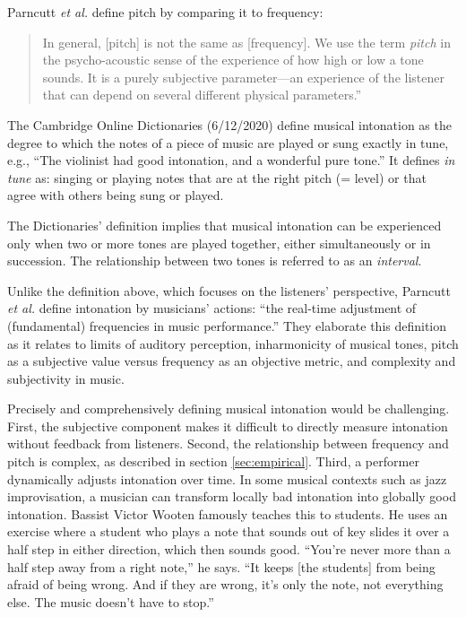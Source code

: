 Parncutt \textit{et al.} define pitch by comparing it to frequency: 
\begin{quotation}In general, [pitch] is not the same as [frequency]. We use the term \textit{pitch} in the psycho-acoustic sense of the experience of how high or low a tone sounds. It is a purely subjective parameter---an experience of the listener that can depend on several different physical parameters.'' \cite[][p.~477]{parncutt2018psychocultural}\end{quotation}

The Cambridge Online Dictionaries (6/12/2020) define musical intonation as the degree to which the notes of a piece of music are played or sung exactly in  tune,  e.g.,  ``The  violinist  had  good  intonation,  and a wonderful pure tone.'' It defines \textit{in tune} as: singing or playing notes that are at the right pitch (= level) or that agree with others being sung or played. 

The Dictionaries' definition implies that musical intonation can be experienced only when two or more tones are played together, either simultaneously or in succession. The relationship between two tones is referred to as an \textit{interval}.

Unlike the definition above, which focuses on the listeners' perspective, Parncutt \textit{et al.} define intonation by musicians' actions: ``the real-time adjustment of (fundamental) frequencies in music performance.'' \cite[p.~477]{parncutt2018psychocultural} They elaborate this definition as it relates to limits of auditory perception, inharmonicity of musical tones, pitch as a subjective value versus frequency as an objective metric, and complexity and subjectivity in music.

Precisely and comprehensively defining musical intonation would be challenging. First, the subjective component makes it difficult to directly measure intonation without feedback from listeners. Second, the relationship between frequency and pitch is complex, as described in section \ref{sec:empirical}. Third, a performer dynamically adjusts intonation over time. In some musical contexts such as jazz improvisation, a musician can transform locally bad intonation into globally good intonation. Bassist Victor Wooten famously teaches this to students. He uses an exercise where a student who plays a note that sounds out of key slides it over a half step in either direction, which then sounds good. ``You’re never more than a half step away from a right note,'' he says. ``It keeps [the students] from being afraid of being wrong. And if they are wrong, it’s only the note, not everything else. The music doesn’t have to stop.'' \cite{Freddy2020}

